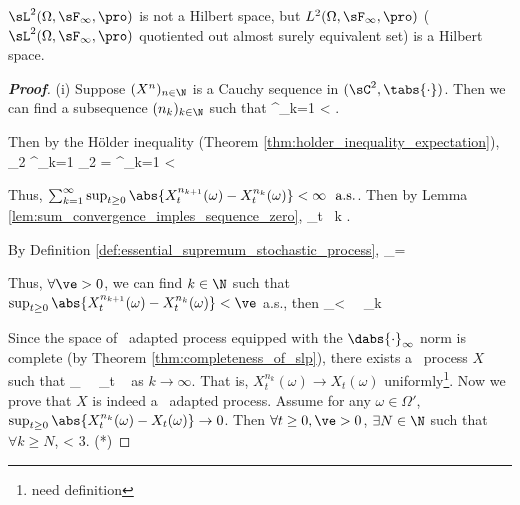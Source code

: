 \begin{remark}
$\sL^2(\Omega,\sF_\infty,\pro)$ is not a Hilbert space, but $L^2(\Omega,\sF_\infty,\pro)$ ($\sL^2(\Omega,\sF_\infty,\pro)$ quotiented out almost surely equivalent set) is a Hilbert space.
\end{remark}

\begin{proof}[\bf Proof]
\ben
\item [(i)] Suppose $(X^n)_{n\in \N}$ is a Cauchy sequence in $(\sC^2, \tabs{\cdot})$. Then we can find a subsequence $(n_k)_{k\in \N}$ such that
\be
\sum^\infty_{k=1}  < \infty.
\ee

Then by the H\"older inequality (Theorem \ref{thm:holder_inequality_expectation}),
\be
{}_2 \leq \sum^\infty_{k=1}  _2  =  \sum^\infty_{k=1}  < \infty
\ee

Thus, $\sum^\infty_{k=1} \sup_{t\geq0} \abs{X^{n_{k+1}}_t (\omega) - X^{n_k}_t (\omega)} < \infty\ \text{ a.s.}$. Then by Lemma \ref{lem:sum_convergence_imples_sequence_zero},
\be
\sup_{t}   \ k \to \infty.
\ee

By Definition \ref{def:essential_supremum_stochastic_process},%
\beast
{}_\infty =  \inf{}
\eeast

Thus, $\forall \ve >0$, we can find $k\in \N$ such that $\sup_{t\geq0} \abs{X^{n_{k+1}}_t (\omega) - X^{n_k}_t (\omega)} < \ve$ a.s., then
\be
{}_\infty < \ve \ \ra \ _{k\in \N}
\ee


Since the space of \cadlag\ adapted process equipped with the $\dabs{ \cdot}_\infty$ norm is complete (by Theorem \ref{thm:completeness_of_slp}), there exists a \cadlag\ process $X$ such that
\be
{}_\infty {} \ \ra \ \sup_{t}  \ 
\ee
as $k \to\infty$. That is, $X^{n_{k}}_t (\omega) \to X_t (\omega)$ uniformly\footnote{need definition}. %
Now we prove that $X$ is indeed a \cadlag\ adapted process. Assume for any $\omega \in \Omega'$, $\sup_{t\geq0} \abs{X^{n_{k}}_t (\omega) - X_t (\omega)} \to 0$. Then $\forall t\geq 0, \ve >0$, $\exists N\in \N$ such that $\forall k\geq N$,
\be
{} < \frac{\ve}3. \quad\quad (*)
\ee


\end{proof}
